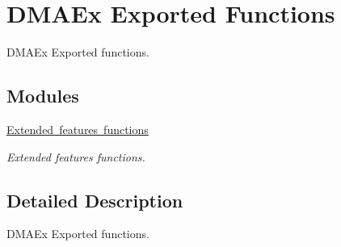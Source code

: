 \hypertarget{group___d_m_a_ex___exported___functions}{}\section{D\+M\+A\+Ex Exported Functions}
\label{group___d_m_a_ex___exported___functions}


D\+M\+A\+Ex Exported functions.  


\subsection*{Modules}
\begin{DoxyCompactItemize}
\item 
\mbox{\hyperlink{group___d_m_a_ex___exported___functions___group1}{Extended features functions}}
\begin{DoxyCompactList}\small\item\em Extended features functions. \end{DoxyCompactList}\end{DoxyCompactItemize}


\subsection{Detailed Description}
D\+M\+A\+Ex Exported functions. 

